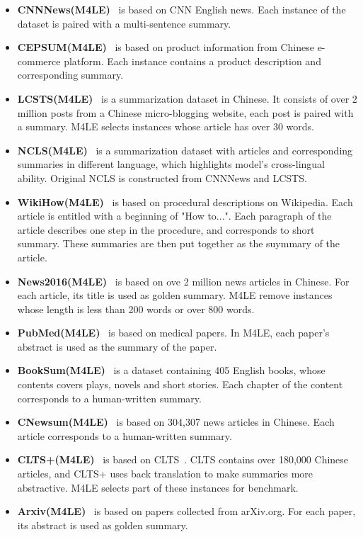 \begin{itemize}[leftmargin=10pt]
 \item \textbf{CNNNews(M4LE)}~\cite{kwan_m4le:_2023} is based on CNN English news. Each instance of the dataset is paired with a multi-sentence summary. %
 \item \textbf{CEPSUM(M4LE)}~\cite{kwan_m4le:_2023} is based on product information from Chinese e-commerce platform. Each instance contains a product description and corresponding summary. 
 \item \textbf{LCSTS(M4LE)}~\cite{kwan_m4le:_2023} is a summarization dataset in Chinese. It consists of over 2 million posts from a Chinese micro-blogging website, each post is paired with a summary. M4LE selects instances whose article has over 30 words.
 \item \textbf{NCLS(M4LE)}~\cite{kwan_m4le:_2023} is a summarization dataset with articles and corresponding summaries in different language, which highlights model's cross-lingual ability. Original NCLS is constructed from CNNNews and LCSTS.
 \item \textbf{WikiHow(M4LE)}~\cite{kwan_m4le:_2023} is based on procedural descriptions on Wikipedia. Each article is entitled with a beginning of "How to...". Each paragraph of the article describes one step in the procedure, and corresponds to short summary. These summaries are then put together as the suymmary of the article. 
 \item \textbf{News2016(M4LE)}~\cite{kwan_m4le:_2023} is based on ove 2 million news articles in Chinese. For each article, its title is used as golden summary. M4LE remove instances whose length is less than 200 words or over 800 words. 
 \item \textbf{PubMed(M4LE)}~\cite{kwan_m4le:_2023} is based on medical papers. In M4LE, each paper's abstract is used as the summary of the paper. 
 \item \textbf{BookSum(M4LE)}~\cite{kwan_m4le:_2023} is a dataset containing 405 English books, whose contents covers plays, novels and short stories. Each chapter of the content corresponds to a human-written summary. 
 \item \textbf{CNewsum(M4LE)}~\cite{kwan_m4le:_2023} is based on 304,307 news articles in Chinese. Each article corresponds to a human-written summary.
 \item \textbf{CLTS+(M4LE)}~\cite{kwan_m4le:_2023} is based on CLTS~\cite{zhu_natural_clts_2020}. CLTS contains over 180,000 Chinese articles, and CLTS+ uses back translation to make summaries more abstractive. M4LE selects part of these instances for benchmark.
 \item \textbf{Arxiv(M4LE)}~\cite{kwan_m4le:_2023} is based on papers collected from arXiv.org. For each paper, its abstract is used as golden summary.

\end{itemize}

